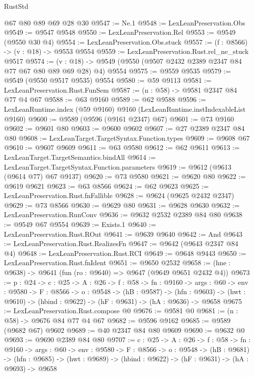\begin{lexlean}{RustStd}
\begin{coremodule}
    @67
    @80
    @89
    @69
    @28
    @30
@9547 := Ne.{1}
@9548 := LexLeanPreservation.Obs
@9549 := @9547 @9548
@9550 := LexLeanPreservation.Rel
@9553 := @9549 (@9550 @30 @4)
@9554 := LexLeanPreservation.Obs.stuck
@9557 := (f : @8566) -> (v : @18) -> @9553 @9554
@9559 := LexLeanPreservation.Rust.rel_ne_stuck @9517
@9574 := (v : @18) -> @9549 (@9550 (@9507 @2432 @2389 @2347 @84 @77 @67 @80 @89 @69 @28) @4) @9554
@9575 := @9559 @9535
@9579 := @9549 (@9550 @9517 @9535) @9554
@9580 := @59 @9113
@9581 := LexLeanPreservation.Rust.FunSem
@9587 := (n : @58) -> @9581 @2347 @84 @77 @4 @67
@9588 := @63 @9160
@9589 := @62 @9588
@9596 := LexLeanRuntime.index (@59 @9160) @9160 (LexLeanRuntime.instIndexableList @9160)
@9600 := @9589 (@9596 (@9161 @2347) @67)
@9601 := @73 @9160
@9602 := @9601 @80
@9603 := @9600 @9602
@9607 := @27 @2389 @2347 @84 @80
@9608 := LexLeanTarget.TargetSyntax.Function.types
@9609 := @9608 @67
@9610 := @9607 @9609
@9611 := @63 @9580
@9612 := @62 @9611
@9613 := LexLeanTarget.TargetSemantics.bindAll
@9614 := LexLeanTarget.TargetSyntax.Function.parameters
@9619 := @9612 (@9613 (@9614 @77) @67 @9137)
@9620 := @73 @9580
@9621 := @9620 @80
@9622 := @9619 @9621
@9623 := @63 @8566
@9624 := @62 @9623
@9625 := LexLeanPreservation.Rust.fnFallible
@9628 := @9624 (@9625 @2432 @2347)
@9629 := @73 @8566
@9630 := @9629 @80
@9631 := @9628 @9630
@9632 := LexLeanPreservation.RunConv
@9636 := @9632 @2532 @2389 @84 @80
@9638 := @9549 @67 @9554
@9639 := Exists.{1}
@9640 := LexLeanPreservation.Rust.ROut
@9641 := @9639 @9640
@9642 := And
@9643 := LexLeanPreservation.Rust.RealizesFn
@9647 := @9642 (@9643 @2347 @84 @4)
@9648 := LexLeanPreservation.Rust.RCI
@9649 := @9648 @9443
@9650 := LexLeanPreservation.Rust.fnIdent
@9651 := @9650 @2532
@9658 := (hne : @9638) -> @9641 (fun (ro : @9640) => @9647 (@9649 @9651 @2432 @4))
@9673 := {p : @24} ->
  {c : @25} ->
  {A : @26} ->
  {f : @58} ->
  {fn : @9160} ->
  {args : @60} ->
  {env : @9580} ->
  {F : @8566} ->
  {o : @9548} ->
  (hB : @9587) ->
  (hfn : @9603) -> (hwt : @9610) -> (hbind : @9622) -> (hF : @9631) -> (hA : @9636) -> @9658
@9675 := LexLeanPreservation.Rust.compose @0
@9676 := @9581 @0
@9681 := (n : @58) -> @9676 @84 @77 @4 @67
@9682 := @9596 @9162
@9685 := @9589 (@9682 @67) @9602
@9689 := @40 @2347 @84 @80 @9609
@9690 := @9632 @0
@9693 := @9690 @2389 @84 @80
@9707 := {c : @25} ->
  {A : @26} ->
  {f : @58} ->
  {fn : @9160} ->
  {args : @60} ->
  {env : @9580} ->
  {F : @8566} ->
  {o : @9548} ->
  (hB : @9681) ->
  (hfn : @9685) -> (hwt : @9689) -> (hbind : @9622) -> (hF : @9631) -> (hA : @9693) -> @9658

\end{coremodule}
\end{lexlean}
